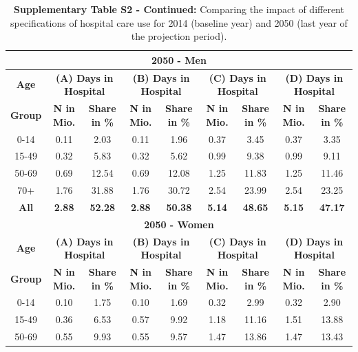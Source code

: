 \begin{landscape}
\begin{table}[htbp]
  \centering
  \caption*{	\textbf{Supplementary Table S2 - Continued:} Comparing the impact of different 
  				specifications of hospital care use for 2014 (baseline year) and 
  				2050 (last year of the projection period).}
    \begin{tabular}{c|cc|cc|cc|cc}
    \toprule
    \multicolumn{9}{c}{\textbf{2050  - Men}} \\
    \midrule
    \textbf{Age} & \multicolumn{2}{c|}{\textbf{(A) Days in Hospital}} & \multicolumn{2}{c|}{\textbf{(B) Days in Hospital}} & \multicolumn{2}{c|}{\textbf{(C) Days in Hospital}} & \multicolumn{2}{c}{\textbf{(D) Days in Hospital}} \\
    \textbf{Group} & \textbf{N in Mio.} & \textbf{Share in \%} & \textbf{N in Mio.} & \textbf{Share in \%} & \textbf{N in Mio.} & \textbf{Share in \%} & \textbf{N in Mio.} & \textbf{Share in \%} \\
    \midrule
    0-14  & 0.11  & 2.03  & 0.11  & 1.96  & 0.37  & 3.45  & 0.37  & 3.35 \\
    15-49 & 0.32  & 5.83  & 0.32  & 5.62  & 0.99  & 9.38  & 0.99  & 9.11 \\
    50-69 & 0.69  & 12.54 & 0.69  & 12.08 & 1.25  & 11.83 & 1.25  & 11.46 \\
    70+   & 1.76  & 31.88 & 1.76  & 30.72 & 2.54  & 23.99 & 2.54  & 23.25 \\
    \midrule
    \textbf{All } & \textbf{2.88} & \textbf{52.28} & \textbf{2.88} & \textbf{50.38} & \textbf{5.14} & \textbf{48.65} & \textbf{5.15} & \textbf{47.17} \\
    \midrule
    \multicolumn{9}{c}{\textbf{2050  - Women}} \\
    \midrule
    \textbf{Age } & \multicolumn{2}{c|}{\textbf{(A) Days in Hospital}} & \multicolumn{2}{c|}{\textbf{(B) Days in Hospital}} & \multicolumn{2}{c|}{\textbf{(C) Days in Hospital}} & \multicolumn{2}{c}{\textbf{(D) Days in Hospital}} \\
    \textbf{Group} & \textbf{N in Mio.} & \textbf{Share in \%} & \textbf{N in Mio.} & \textbf{Share in \%} & \textbf{N in Mio.} & \textbf{Share in \%} & \textbf{N in Mio.} & \textbf{Share in \%} \\
    \midrule
    0-14  & 0.10   & 1.75  & 0.10   & 1.69  & 0.32  & 2.99  & 0.32  & 2.90 \\
    15-49 & 0.36   & 6.53  & 0.57   & 9.92  & 1.18  & 11.16 & 1.51  & 13.88 \\
    50-69 & 0.55   & 9.93  & 0.55   & 9.57  & 1.47  & 13.86 & 1.47  & 13.43 \\

\end{tabular}
\end{table}
\end{landscape}
